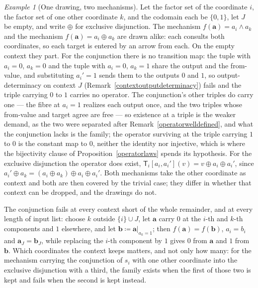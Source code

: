 \documentclass{article}
\theoremstyle{definition}
\theoremstyle{remark}
\newtheorem{example}[proposition]{Example}
\begin{document}
\begin{example}[One drawing, two mechanisms]
\label{samedrawing}
Let the factor set of the coordinate $i$, the factor set of one other coordinate $k$, and the codomain each be $\{0,1\}$, let $J$ be empty, and write $\oplus$ for exclusive disjunction. The mechanism $f(\boldsymbol{a}) = a_i \wedge a_k$ and the mechanism $f(\boldsymbol{a}) = a_i \oplus a_k$ are drawn alike: each consults both coordinates, so each target is entered by an arrow from each. On the empty context they part. For the conjunction there is no transition map: the tuple with $a_i = 0$, $a_k = 0$ and the tuple with $a_i = 0$, $a_k = 1$ share the output and the from-value, and substituting $a_i' = 1$ sends them to the outputs $0$ and $1$, so output-determinacy on context $J$ (Remark~\ref{contextoutputdeterminacy}) fails and the triple carrying $0$ to $1$ carries no operator. The conjunction's other triples do carry one --- the fibre at $a_i = 1$ realizes each output once, and the two triples whose from-value and target agree are free --- so existence at a triple is the weaker demand, as the two were separated after Remark~\ref{operatorwelldefined}, and what the conjunction lacks is the family; the operator surviving at the triple carrying $1$ to $0$ is the constant map to $0$, neither the identity nor injective, which is where the bijectivity clause of Proposition~\ref{operatorlaws} spends its hypothesis. For the exclusive disjunction the operator does exist, $\mathsf{T}_i[a_i, a_i'](v) = v \oplus a_i \oplus a_i'$, since $a_i' \oplus a_k = (a_i \oplus a_k) \oplus a_i \oplus a_i'$. Both mechanisms take the other coordinate as context and both are then covered by the trivial case; they differ in whether that context can be dropped, and the drawings do not.
\end{example}

\noindent The conjunction fails at every context short of the whole remainder, and at every length of input list: choose $k$ outside $\{i\} \cup J$, let $\boldsymbol{a}$ carry $0$ at the $i$-th and $k$-th components and $1$ elsewhere, and let $\boldsymbol{b} \coloneqq \boldsymbol{a}|_{a_k = 1}$; then $f(\boldsymbol{a}) = f(\boldsymbol{b})$, $a_i = b_i$ and $\boldsymbol{a}_J = \boldsymbol{b}_J$, while replacing the $i$-th component by $1$ gives $0$ from $\boldsymbol{a}$ and $1$ from $\boldsymbol{b}$. Which coordinates the context keeps matters, and not only how many: for the mechanism carrying the conjunction of $s_i$ with one other coordinate into the exclusive disjunction with a third, the family exists when the first of those two is kept and fails when the second is kept instead.
\end{document}
